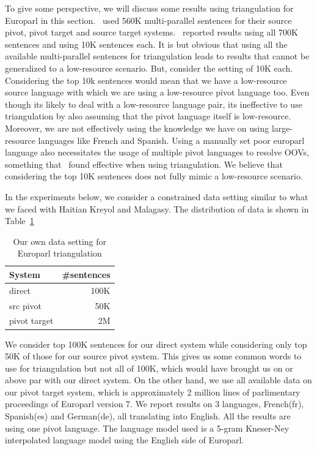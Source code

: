 To give some perspective, we will discuss some results using triangulation for Europarl in this section.~\cite{Utiyama:07} used 560K multi-parallel sentences for their source pivot, pivot target and source target systems.~\cite{Cohn:07} reported results using all 700K sentences and using 10K sentences each. It is but obvious that using all the available multi-parallel sentences for triangulation leads to results that cannot be generalized to a low-resource scenario. But, consider the setting of 10K each. Considering the top 10k sentences would mean that we have a low-resource source language with which we are using a low-resource pivot language too. Even though its likely to deal with a low-resource language pair, its ineffective to use triangulation by also assuming that the pivot language itself is low-resource. Moreover, we are not effectively using the knowledge we have on using large-resource languages like French and Spanish. Using a manually set poor europarl language also necessitates the usage of multiple pivot languages to resolve OOVs, something that~\cite{Cohn:07} found effective when using triangulation. We believe that considering the top 10K sentences does not fully mimic a low-resource scenario. 

In the experiments below, we consider a constrained data setting similar to what we faced with Haitian Kreyol and Malagasy. The distribution of data is shown in Table~\ref{table:eparlsetting}

\begin{table}
	\small
	\centering
	\begin{tabular}{lr}
		\toprule
		System & \#sentences \\
		\toprule
		direct & 100K \\
		src pivot & 50K \\
		pivot target & 2M \\
		\bottomrule
	\end{tabular}
	\caption{Our own data setting for Europarl triangulation}
	\label{table:eparlsetting}
\end{table}

We consider top 100K sentences for our direct system while considering only top 50K of those for our source pivot system. This gives us some common words to use for triangulation but not all of 100K, which would have brought us on or above par with our direct system. On the other hand, we use all available data on our pivot target system, which is approximately 2 million lines of parlimentary proceedings of Europarl version 7. We report results on 3 languages, French(fr), Spanish(es) and German(de), all translating into English. All the results are using one pivot language. The language model used is a 5-gram Kneser-Ney interpolated language model using the English side of Europarl. 




